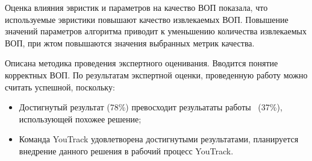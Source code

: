 Оценка влияния эвристик и параметров на качество ВОП показала, что используемые эвристики повышают качество извлекаемых ВОП. Повышение значений параметров алгоритма приводит к уменьшению количества извлекаемых ВОП, при жтом повышаются значения выбранных метрик качества.

Описана методика проведения экспертного оценивания. Вводится понятие корректных ВОП. По результатам экспертной оценки, проведенную работу можно считать успешной, поскольку:

\begin{itemize}
\item Достигнутый результат (78\%) превосходит резульататы работы~\cite{original} (37\%), использующей похожее решение;
\item Команда YouTrack удовлетворена достигнутыми результатами, планируется внедрение данного решения в рабочий процесс YouTrack.
\end{itemize}